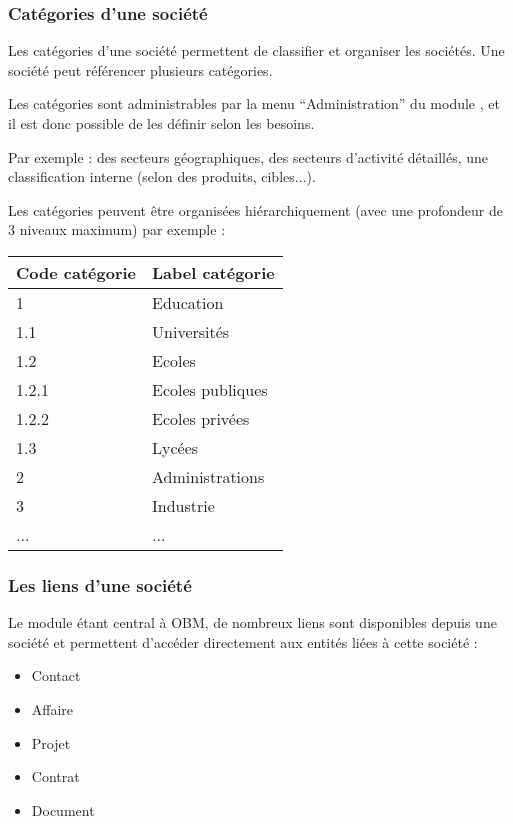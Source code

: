 \subsubsection{Catégories d'une société}
Les catégories d'une société permettent de classifier et organiser les sociétés.
Une société peut référencer plusieurs catégories.

Les catégories sont administrables par la menu ``Administration'' du module \company, et il est donc possible de les définir selon les besoins.

Par exemple : des secteurs géographiques, des secteurs d'activité détaillés, une classification interne (selon des produits, cibles...).

Les catégories peuvent être organisées hiérarchiquement (avec une profondeur de 3 niveaux maximum) par exemple :\\

\begin{tabular}{|p{3cm}|p{10cm}|}
\hline\textbf{Code catégorie} & \textbf{Label catégorie} \\
\hline
1 & Education\\
\hline
1.1 & Universités\\
\hline
1.2 & Ecoles\\
\hline
1.2.1 & Ecoles publiques\\
\hline
1.2.2 & Ecoles privées\\
\hline
1.3 & Lycées\\
\hline
2 & Administrations\\
\hline
3 & Industrie\\
\hline
... & ...\\
\hline
\end{tabular}


\subsubsection{Les liens d'une société}

Le module \company étant central à OBM, de nombreux liens sont disponibles depuis une société et permettent d'accéder directement aux entités liées à cette société :\\

\begin{itemize}
\item Contact
\item Affaire
\item Projet
\item Contrat
\item Document
\end{itemize}

